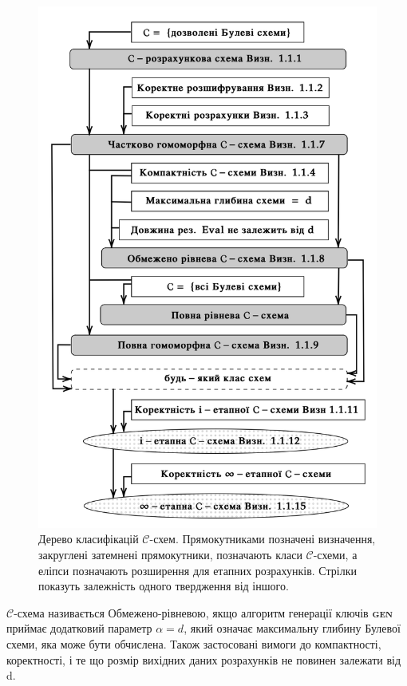 \begin{figure}[!ht]
    \centering
    \includegraphics[scale=0.75]{static/classification.png}
    \caption{Дерево класифікацій \(\mathcal{C}\)-схем. Прямокутниками позначені визначення,
    закруглені затемнені прямокутники, позначають класи \(\mathcal{C}\)-схеми, а еліпси
    позначають розширення для етапних розрахунків. Стрілки показуть залежність одного 
    твердження від іншого.}
    \label{fig:classification}
\end{figure}

\begin{definition}
\(\mathcal{C}\)-схема називається Обмежено-рівневою, якщо алгоритм генерації ключів
\textsc{\textbf{gen}} приймає додатковий параметр \(\alpha=d\), який означає максимальну
глибину Булевої схеми, яка може бути обчислена. Також застосовані вимоги до компактності,
коректності, і те що розмір вихідних даних розрахунків не повинен залежати від d.

\end{definition}

